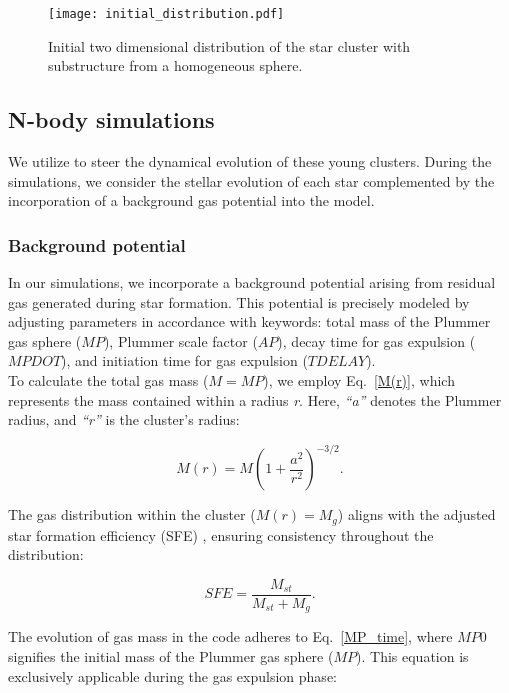 \documentclass[baaa]{baaa}
\begin{document}
\begin{figure}[!t]
\centering
\texttt{[image: initial\_distribution.pdf]}
\caption{Initial two dimensional distribution of the star cluster with substructure from a homogeneous sphere.}
\label{initial_distribution}
\end{figure}

\subsection{N-body simulations}
We utilize {} to steer the dynamical evolution of these young clusters. During the simulations, we consider the stellar evolution of each star complemented by the incorporation of a background gas potential into the model.

\subsubsection{Background potential}
In our simulations, we incorporate a background potential arising from residual gas generated during star formation. This potential is precisely modeled by adjusting parameters in accordance with {} keywords: total mass of the Plummer gas sphere ($MP$), Plummer scale factor ($AP$), decay time for gas expulsion ($MPDOT$), and initiation time for gas expulsion ($TDELAY$).\\

{To calculate the total gas mass ($M=MP$), we employ Eq.~\ref{M(r)}, which represents the mass contained within a radius \em{r}}. Here, {\em{``a''}} denotes the Plummer radius, and {\em{``r''}} is the cluster's radius:

\begin{equation}
    M(r)= M\left(1+\frac{a^2}{r^2}\right)^{-3/2}\label{M(r)}.
\end{equation}

The gas distribution within the cluster ($M(r)=M_g$) aligns with the adjusted star formation efficiency (SFE) \citep{JP_2015}, ensuring consistency throughout the distribution: 

\begin{equation}
    SFE = \frac{M_{st}}{M_{st}+M_g}.
    \label{SFE}
\end{equation}

The evolution of gas mass in the code adheres to Eq.~\ref{MP_time}, where $MP0$ signifies the initial mass of the Plummer gas sphere ($MP$). This equation is exclusively applicable during the gas expulsion phase:
\end{document}

